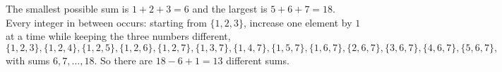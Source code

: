 The smallest possible sum is $1+2+3=6$ and the largest is $5+6+7=18$. Every integer in between occurs: starting from $\{1,2,3\}$, increase one element by $1$ at a time while keeping the three numbers different,
\[
\{1,2,3\},\{1,2,4\},\{1,2,5\},\{1,2,6\},\{1,2,7\},\{1,3,7\},\{1,4,7\},\{1,5,7\},\{1,6,7\},\{2,6,7\},\{3,6,7\},\{4,6,7\},\{5,6,7\},
\]
with sums $6,7,\dots,18$. So there are $18-6+1=\boxed{13}$ different sums.
